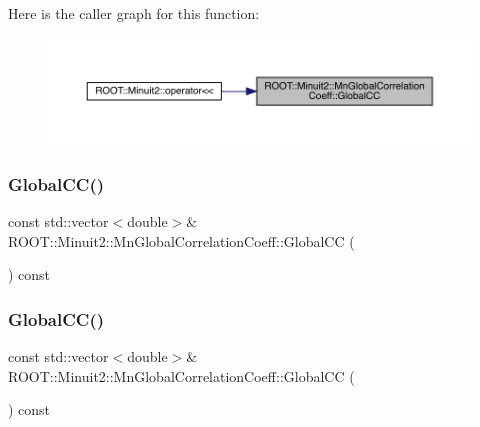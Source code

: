 Here is the caller graph for this function\+:
\nopagebreak
\begin{figure}[H]
\begin{center}
\leavevmode
\includegraphics[width=350pt]{da/d0d/classROOT_1_1Minuit2_1_1MnGlobalCorrelationCoeff_ab078e8b07600339fea0af842a8e2de00_icgraph}
\end{center}
\end{figure}
\mbox{\label{classROOT_1_1Minuit2_1_1MnGlobalCorrelationCoeff_ab078e8b07600339fea0af842a8e2de00}} 
\subsubsection{\texorpdfstring{GlobalCC()}{GlobalCC()}\hspace{0.1cm}{\footnotesize\ttfamily [2/3]}}
{\footnotesize\ttfamily const std\+::vector$<$double$>$\& R\+O\+O\+T\+::\+Minuit2\+::\+Mn\+Global\+Correlation\+Coeff\+::\+Global\+CC (\begin{DoxyParamCaption}{ }\end{DoxyParamCaption}) const\hspace{0.3cm}{\ttfamily [inline]}}

\mbox{\label{classROOT_1_1Minuit2_1_1MnGlobalCorrelationCoeff_ab078e8b07600339fea0af842a8e2de00}} 
\subsubsection{\texorpdfstring{GlobalCC()}{GlobalCC()}\hspace{0.1cm}{\footnotesize\ttfamily [3/3]}}
{\footnotesize\ttfamily const std\+::vector$<$double$>$\& R\+O\+O\+T\+::\+Minuit2\+::\+Mn\+Global\+Correlation\+Coeff\+::\+Global\+CC (\begin{DoxyParamCaption}{ }\end{DoxyParamCaption}) const\hspace{0.3cm}{\ttfamily [inline]}}

